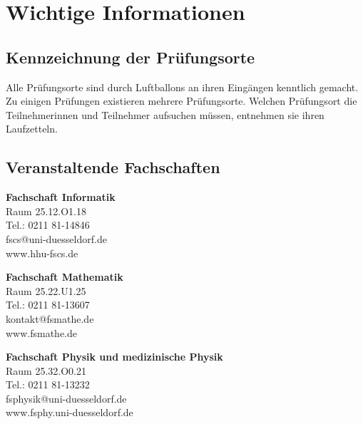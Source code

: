 \documentclass[a4paper,10pt]{article}
\begin{document}
\section[Informationen]{Wichtige Informationen}
\subsection{Kennzeichnung der Prüfungsorte }
Alle Prüfungsorte sind durch Luftballons an ihren Eingängen kenntlich gemacht. 
Zu einigen Prüfungen existieren mehrere Prüfungsorte. Welchen Prüfungsort die 
Teilnehmerinnen und Teilnehmer aufsuchen müssen, entnehmen sie ihren Laufzetteln.

\subsection{Veranstaltende Fachschaften}

\textbf{Fachschaft Informatik}\\
Raum 25.12.O1.18\\
Tel.: 0211 81-14846\\
fscs@uni-duesseldorf.de\\
www.hhu-fscs.de

\textbf{Fachschaft Mathematik}\\
Raum 25.22.U1.25\\
Tel.: 0211 81-13607\\
kontakt@fsmathe.de\\
www.fsmathe.de

\textbf{Fachschaft Physik und medizinische Physik}\\
Raum 25.32.O0.21\\
Tel.: 0211 81-13232\\
fsphysik@uni-duesseldorf.de\\
www.fsphy.uni-duesseldorf.de
\end{document}

